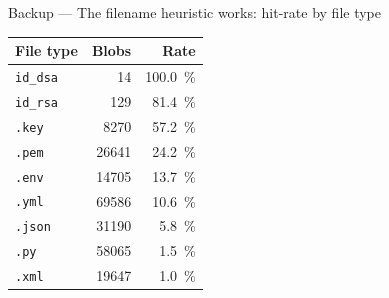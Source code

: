 \documentclass[aspectratio=169]{beamer}
\begin{document}
\begin{frame}{Backup --- The filename heuristic works: hit-rate by file type}
            \centering
            \begin{tabular}{lrr}
                \toprule
                \textbf{File type} & \textbf{Blobs} & \textbf{Rate} \\
                \midrule
                \texttt{id\_dsa}     & \num{14}    & \SI{100.0}{\percent} \\
                \texttt{id\_rsa}     & \num{129}   & \SI{81.4}{\percent}  \\
                \texttt{.key}        & \num{8270}  & \SI{57.2}{\percent}  \\
                \texttt{.pem}        & \num{26641} & \SI{24.2}{\percent}  \\
                \texttt{.env}        & \num{14705} & \SI{13.7}{\percent}  \\
                \texttt{.yml}        & \num{69586} & \SI{10.6}{\percent}  \\
                \texttt{.json}       & \num{31190} & \SI{5.8}{\percent}   \\
                \texttt{.py}         & \num{58065} & \SI{1.5}{\percent}   \\
                \texttt{.xml}        & \num{19647} & \SI{1.0}{\percent}   \\
                \bottomrule
            \end{tabular}
\end{frame}
\end{document}
